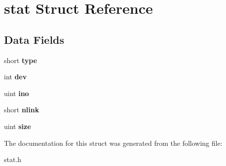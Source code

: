 \hypertarget{structstat}{}\section{stat Struct Reference}
\label{structstat}
\subsection*{Data Fields}
\begin{DoxyCompactItemize}
\item 
\mbox{\label{structstat_a01f1b4cd7627d192a7875c9a188e0699}} 
short {\bfseries type}
\item 
\mbox{\label{structstat_a14ef4f85e6fb86bf296360361d0f393b}} 
int {\bfseries dev}
\item 
\mbox{\label{structstat_abf15624517ed5d79d0fa2a5553a68e25}} 
uint {\bfseries ino}
\item 
\mbox{\label{structstat_a99ca3487fd2f4799337eb4281f8871e4}} 
short {\bfseries nlink}
\item 
\mbox{\label{structstat_a4ac15b64dd4d787c59a8a687d79adb35}} 
uint {\bfseries size}
\end{DoxyCompactItemize}


The documentation for this struct was generated from the following file\+:\begin{DoxyCompactItemize}
\item 
stat.\+h\end{DoxyCompactItemize}
